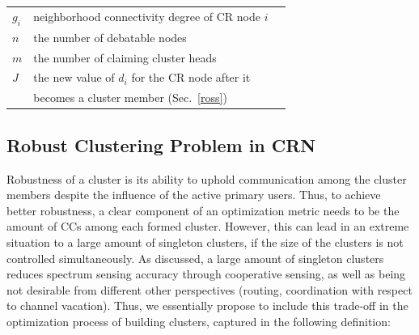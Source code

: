\documentclass[times]{ettauth}
\newcommand{\ie}{i.e., }
\theoremstyle{mytheoremstyle}
\theoremstyle{mytheoremstyle}
\theoremstyle{mytheoremstyle}
\begin{document}
\begin{table}[h!]
\begin{tabular}{llr}
$g_i$  & neighborhood connectivity degree of CR node $i$\\
  $n$ & the number of debatable nodes\\
 $m$ & the number of claiming cluster heads\\
 $J$ & the new value of $d_i$ for the CR node after it\\
 & becomes a cluster member (Sec.~\ref{ross})\\
\bottomrule
\end{tabular}
\end{table}



\subsection{Robust Clustering Problem in CRN}
\label{problem}


Robustness of a cluster is its ability to uphold communication among the cluster members despite the influence of the active primary users.
Thus, to achieve better robustness, a clear component of an optimization metric needs to be the amount of CCs among each formed cluster. 
However, this can lead in an extreme situation to a large amount of singleton clusters, if the size of the clusters is not controlled simultaneously. 
As discussed, a large amount of singleton clusters reduces spectrum sensing accuracy through cooperative sensing, as well as being not desirable from different other perspectives (routing, coordination with respect to channel vacation).
Thus, we essentially propose to include this trade-off in the optimization process of building clusters, captured in the following definition:
\end{document}
